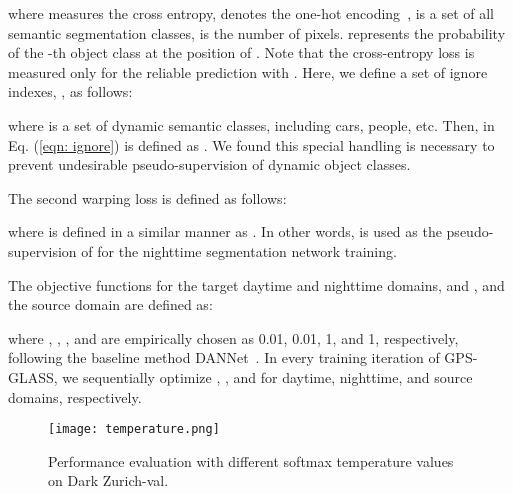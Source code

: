 \documentclass[10pt,twocolumn,letterpaper]{article}
\begin{document}
where  measures the cross entropy,  denotes the one-hot encoding~\cite{wu2021dannet},  is a set of all semantic segmentation classes,  is the number of pixels.  represents the probability of the -th object class at the position  of . Note that the cross-entropy loss is measured only for the reliable prediction with . Here, we define a set of ignore indexes, , as follows:

where  is a set of dynamic semantic classes, including cars, people, etc. Then,  in Eq. (\ref{eqn: ignore}) is defined as . We found this special handling is necessary to prevent undesirable pseudo-supervision of dynamic object classes. 

The second warping loss  is defined as follows:

where  is defined in a similar manner as . In other words,  is used as the pseudo-supervision of  for the nighttime segmentation network training. 

The objective functions for the target daytime and nighttime domains,  and , and the source domain  are defined as:



where , , , and  are empirically chosen as 0.01, 0.01, 1, and 1, respectively, following the baseline method DANNet~\cite{wu2021dannet}. In every training iteration of GPS-GLASS, we sequentially optimize , , and  for daytime, nighttime, and source domains, respectively.

\begin{figure}[t]
  \centering
  \texttt{[image: temperature.png]}
  \caption{Performance evaluation with different softmax temperature values on Dark Zurich-val.}
  \label{figure:temperature}
\end{figure}
\end{document}
